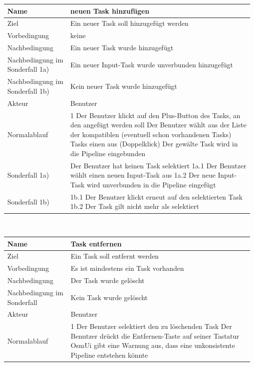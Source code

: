 \documentclass[a4paper,12pt]{scrartcl}
\begin{document}
\begin{center}
\begin{tabular}{|p{5cm}|p{10cm}|}
\hline Name & \textbf{neuen Task hinzufügen} \\ 
\hline Ziel & Ein neuer Task soll hinzugefügt werden \\ 
\hline Vorbedingung& keine \\
\hline Nachbedingung & Ein neuer Task wurde hinzugefügt \\ 
\hline Nachbedingung im Sonderfall 1a) & Ein neuer Input-Task wurde unverbunden hinzugefügt\\
\hline Nachbedingung im Sonderfall 1b) & Kein neuer Task wurde hinzugefügt\\
\hline Akteur & Benutzer \\ 
\hline Normalablauf & 1 Der Benutzer klickt auf den Plus-Button des Tasks, an den angefügt werden soll
\newline 2 Der Benutzer wählt aus der Liste der kompatiblen (eventuell schon vorhandenen Tasks) Tasks einen aus (Doppelklick)
\newline 3 Der gewälte Task wird in die Pipeline eingebunden\\ 
\hline Sonderfall 1a) & Der Benutzer hat keinen Task selektiert
\newline 1a.1 Der Benutzer wählt einen neuen Input-Task aus
\newline 1a.2 Der neue Input-Task wird unverbunden in die Pipeline eingefügt\\
\hline Sonderfall 1b) & 1b.1 Der Benutzer klickt erneut auf den selektierten Task
\newline 1b.2 Der Task gilt nicht mehr als selektiert\\
\hline
\end{tabular}
\vspace{0.7cm}
\\
\begin{tabular}{|p{5cm}|p{10cm}|}
\hline Name & \textbf{Task entfernen} \\ 
\hline Ziel & Ein Task soll entfernt werden \\ 
\hline Vorbedingung & Es ist mindestens ein Task vorhanden \\ 
\hline Nachbedingung & Der Task wurde gelöscht \\ 
\hline Nachbedingung im Sonderfall & Kein Task wurde gelöscht \\ 
\hline Akteur & Benutzer \\ 
\hline Normalablauf & 1 Der Benutzer selektiert den zu löschenden Task
\newline 2 Der Benutzer drückt die Entfernen-Taste auf seiner Tastatur
\newline 3 OsmUi gibt eine Warnung aus, dass eine unkonsistente Pipeline entstehen könnte

\end{tabular}
\end{center}
\end{document}

